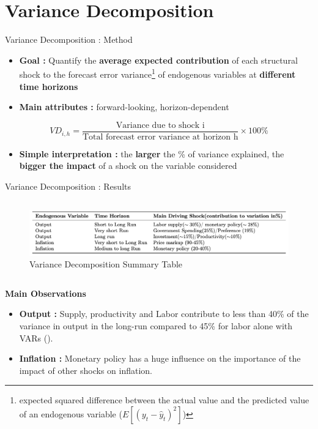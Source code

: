 \documentclass{beamer}
\begin{document}
\section{Variance Decomposition}
			
\begin{frame}{Variance Decomposition : Method}
\begin{itemize}
    \item \textbf{Goal :}  Quantify the \textbf{average expected contribution} of each structural shock to the forecast error variance\footnote{expected squared difference between the actual value and the predicted value of an endogenous variable ($E[(y_t-\hat{y}_t)^2]$)} of endogenous variables at \textbf{different time horizons}
    \item \textbf{Main attributes : } forward-looking, horizon-dependent
\end{itemize}
\vspace{0.5cm}
$$
    VD_{i,h} = \frac{\text{Variance due to shock i}}{\text{Total forecast error variance at horizon h}} \times 100\%
$$
\begin{itemize}
    \item \textbf{Simple interpretation :} the \textbf{larger} the \% of variance explained, the \textbf{bigger the impact} of a shock on the variable considered
\end{itemize}

\end{frame}
					
\begin{frame}{Variance Decomposition : Results}
    \begin{columns}  
        \begin{figure}  
            \includegraphics[width=\linewidth]{images/table_var_decomp.png}  
            \vspace{-0.6cm}  
            \small{\caption{Variance Decomposition Summary Table}}
            \label{fig:var decomp}  
        \end{figure}  
    \end{columns}  
\textbf{Main Observations}
\small{
    \begin{itemize}
        \item \textbf{Output :} Supply, productivity and Labor contribute to less than 40\% of the variance in output in the long-run compared to 45\% for labor alone with VARs (\cite{Shapiro:89}).
        \item \textbf{Inflation :} Monetary policy has a huge influence on the importance of the impact of other shocks on inflation. 
    \end{itemize}
}
\end{frame}
\end{document}
